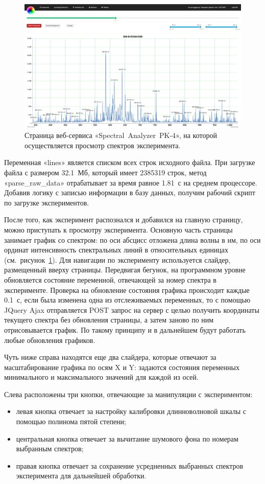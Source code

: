 \begin{figure}[t]
  \centering
  \includegraphics[width=16cm]{figures/experiment}
  \caption{Страница веб-сервиса «Spectral~Analyzer~PK-4», на которой осуществляется просмотр спектров эксперимента.}
  \label{fig:experiment}
\end{figure}
Переменная «lines» является списком всех строк исходного файла. При загрузке файла с размером 32.1~Мб, который имеет
2385319 строк, метод «parse\_raw\_data» отрабатывает за время равное 1.81~с на среднем процессоре. Добавив логику с записью
информации в базу данных, получим рабочий скрипт по загрузке экспериментов.

После того, как эксперимент распознался и добавился на главную страницу, можно приступать к просмотру эксперимента.
Основную часть страницы занимает график со спектром: по оси абсцисс отложена длина волны в нм, по оси ординат интенсивность
спектральных линий в относительных единицах (см.~рисунок~\ref{fig:experiment}). Для навигации по эксперименту используется слайдер,
размещенный вверху страницы. Передвигая бегунок, на программном уровне обновляется состояние переменной, отвечающей за номер спектра в эксперименте.
Проверка на обновление состояния графика происходит каждые 0.1~с, если была изменена одна из отслеживаемых переменных, то
с помощью JQuery Ajax отправляется POST запрос на сервер с целью получить координаты текущего спектра без обновления
страницы, а затем заново по ним отрисовывается график. По такому принципу и в дальнейшем будут работать любые обновления
графиков.

Чуть ниже справа находятся еще два слайдера, которые отвечают за масштабирование графика по осям X и Y: задаются
состояния переменных минимального и максимального значений для каждой из осей.

Слева расположены три кнопки, отвечающие за манипуляции с экспериментом:
\begin{itemize}
\item левая кнопка отвечает за настройку калибровки длинноволновой шкалы с помощью полинома пятой степени;
\item центральная кнопка отвечает за вычитание шумового фона по номерам выбранным спектров;
\item правая кнопка отвечает за сохранение усредненных выбранных спектров эксперимента для дальнейшей обработки.
\end{itemize}


